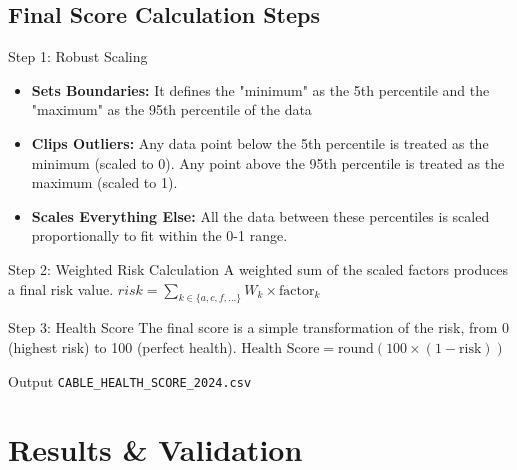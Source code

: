 \documentclass[a4paper,11pt]{article}
\begin{document}
\subsection{Final Score Calculation Steps}
\begin{block}{Step 1: Robust Scaling}

    \begin{itemize}
        \item \textbf{Sets Boundaries:} It defines the "minimum" as the 5th percentile and the "maximum" as the 95th percentile of the data
        \item \textbf{Clips Outliers:}  Any data point below the 5th percentile is treated as the minimum (scaled to 0). Any point above the 95th percentile is treated as the maximum (scaled to 1).
        \item \textbf{ Scales Everything Else:}  All the data between these percentiles is scaled proportionally to fit within the 0-1 range.
    \end{itemize}
\end{block}


\begin{block}{Step 2: Weighted Risk Calculation}
A weighted sum of the scaled factors produces a final risk value.
    $risk = \sum_{k \in \{a,c,f,...\}} W_k \times \text{factor}_k$
\end{block}

\begin{alertblock}{Step 3: Health Score}
    The final score is a simple transformation of the risk, from 0 (highest risk) to 100 (perfect health).
    $\text{Health Score} = \text{round}(100 \times (1 - \text{risk}))$
\end{alertblock}

\begin{block}{Output}
    \texttt{CABLE\_HEALTH\_SCORE\_2024.csv}
\end{block}
\section{Results \& Validation}
\end{document}
